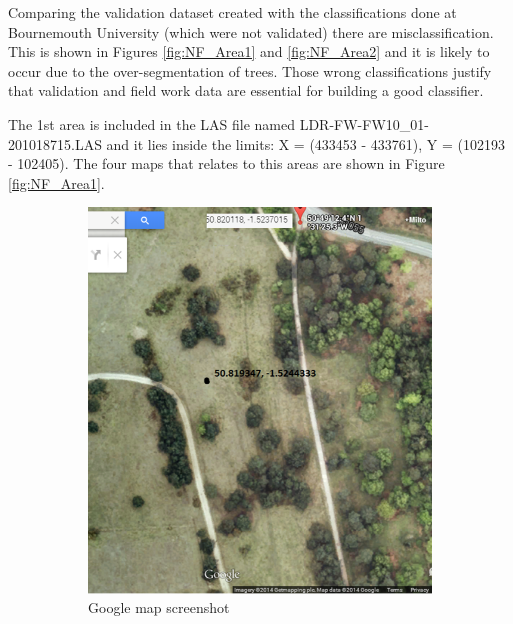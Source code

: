 \documentclass{subfiles}
\begin{document}
	   
	   \par Comparing the validation dataset created with the classifications done at Bournemouth University (which were not validated) there are misclassification. This is shown in Figures \ref{fig:NF_Area1} and \ref{fig:NF_Area2} and it is likely to occur due to the over-segmentation of trees. Those wrong classifications  justify that validation and field work data are essential for building a good classifier. 
	   
	   \newpage
	   \par The 1st area is included in the LAS file named LDR-FW-FW10\_01-201018715.LAS and it lies inside the limits:  X = (433453 - 433761), Y = (102193 - 102405). The four maps that relates to this areas are shown in Figure \ref{fig:NF_Area1}.
	   
	   \begin{figure} [h!]
	   	\begin{subfigure}[t]{.5\textwidth}
	   		\centering
	   		\includegraphics[width=.9\textwidth]{img/NewForest/Area1GoogleMap}
	   		\caption{Google map screenshot}
	   		\label{fig:Area1GoogleMap}
	   	\end{subfigure} \hfill
	   	\begin{subfigure}[t]{.5\textwidth}
	   		\centering

\end{subfigure}
\end{figure}
\end{document}
